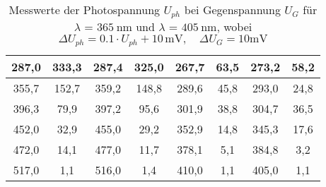\begin{table}[H]
{\begin{tabular}{|c|c|c|c|c|c|c|c|}
287,0             & 333,3           & 287,4         & 325,0            & 267,7           & 63,5           & 273,2         & 58,2           \\ \hline
355,7           & 152,7           & 359,2         & 148,8          & 289,6           & 45,8           & 293,0           & 24,8           \\ \hline
396,3           & 79,9            & 397,2         & 95,6           & 301,9           & 38,8           & 304,7         & 36,5           \\ \hline
452,0             & 32,9            & 455,0           & 29,2           & 352,9           & 14,8           & 345,3         & 17,6           \\ \hline
472,0             & 14,1            & 477,0          & 11,7           & 378,1           & 5,1            & 384,8         & 3,2            \\ \hline
517,0             & 1,1             & 516,0           & 1,4            & 410,0             & 1,1            & 405,0           & 1,1            \\ \hline
\end{tabular}%
}
\caption{Messwerte der Photospannung $U_{ph}$ bei Gegenspannung $U_G$ für $\lambda$ = $\SI{365}{\nm}$ und $\lambda$ = $\SI{405}{\nm}$, wobei $\Delta U_{ph} = 0.1 \cdot U_{ph} + 10\,\si{\milli\volt}, \quad
 \Delta U_{G} = 10 \si{\milli\volt}$}
\label{tab:365and405}
\end{table}

